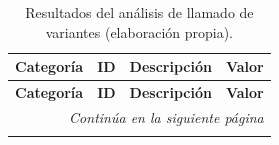 \documentclass[12pt]{article}
\begin{document}
\begin{longtable}{|l|l|p{8cm}|r|}
    \caption{Resultados del análisis de llamado de variantes (elaboración propia).} \label{tabla-variantes} \\
    
    \hline
    \textbf{Categoría} & \textbf{ID} & \textbf{Descripción} & \textbf{Valor} \\
    \hline
    \endfirsthead
    
    \hline
    \textbf{Categoría} & \textbf{ID} & \textbf{Descripción} & \textbf{Valor} \\
    \hline
    \endhead
    
    \hline \multicolumn{4}{|r|}{\textit{Continúa en la siguiente página}} \\ \hline
    \endfoot
    
    \hline
    \endlastfoot
    

\end{longtable}
\end{document}
